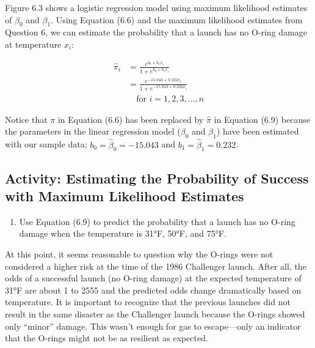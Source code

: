 \documentclass[
]{book}
\providecommand{\tightlist}{%
  \setlength{\itemsep}{0pt}\setlength{\parskip}{0pt}}
\begin{document}
Figure 6.3 shows a logistic regression model using maximum likelihood estimates of \(\beta_0\) and \(\beta_1\). Using Equation (6.6) and the maximum likelihood estimates from Question 6, we can estimate the probability that a launch has no O-ring damage at temperature \(x_i\):

\begin{align}
\hat\pi_i 
&= \frac{e^{b_0 + b_1 x_i}}{1 + e^{b_0 + b_1 x_i}} \\
&= \frac{e^{-15.043 + 0.232 x_i}}{1 + e^{-15.043 + 0.232 x_i}} \\
&\quad \text{for } i = 1,2,3,\dots,n \tag{6.9}
\end{align}

Notice that \(\pi\) in Equation (6.6) has been replaced by \(\hat\pi\) in Equation (6.9) because the parameters in the linear regression model (\(\beta_0\) and \(\beta_1\)) have been estimated with our sample data; \(b_0 = \hat\beta_0 = -15.043\) and \(b_1 = \hat\beta_1 = 0.232\).

\hypertarget{activity-estimating-the-probability-of-success-with-maximum-likelihood-estimates}{%
\subsection*{Activity: Estimating the Probability of Success with Maximum Likelihood Estimates}\label{activity-estimating-the-probability-of-success-with-maximum-likelihood-estimates}}

\begin{enumerate}
\def\labelenumi{\arabic{enumi}.}
\setcounter{enumi}{6}
\tightlist
\item
  Use Equation (6.9) to predict the probability that a launch has no O-ring damage when the temperature is 31°F, 50°F, and 75°F.
\end{enumerate}

At this point, it seems reasonable to question why the O-rings were not considered a higher risk at the time of the 1986 Challenger launch. After all, the odds of a successful launch (no O-ring damage) at the expected temperature of 31°F are about 1 to 2555 and the predicted odds change dramatically based on temperature. It is important to recognize that the previous launches did not result in the same disaster as the Challenger launch because the O-rings showed only ``minor'' damage. This wasn't enough for gas to escape---only an indicator that the O-rings might not be as resilient as expected.
\end{document}
